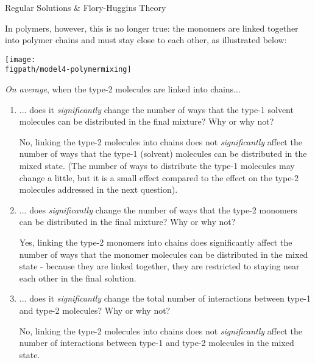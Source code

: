 \begin{activity}{Regular Solutions \& Flory-Huggins Theory}
\begin{model}
In polymers, however, this is no longer true: the monomers are linked together into polymer chains and must stay close to each other, as illustrated below: 
	
	\centerline{\texttt{[image: \\figpath/model4-polymermixing]}}

\end{model}

\begin{ctqs}

	\question \emph{On average}, when the type-2 molecules are linked into chains...
	
		\begin{enumerate}
			\item ... does it \emph{significantly} change the number of ways that the type-1 solvent molecules can be distributed in the final mixture?  Why or why not?
				\label{\labelbase:ctq:FHtype1}
			
				\begin{solution}[1in]{}
					No, linking the type-2 molecules into chains does not \emph{significantly} affect the number of ways that the type-1 (solvent) molecules can be distributed in the mixed state.  (The number of ways to distribute the type-1 molecules may change a little, but it is a small effect compared to the effect on the type-2 molecules addressed in the next question).
				\end{solution}
			
			\item ... does \emph{significantly} change the number of ways that the type-2 monomers can be distributed in the final mixture?  Why or why not?
				\label{\labelbase:ctq:FHtype2}
			
				\begin{solution}[1in]{}
					Yes, linking the type-2 monomers into chains does  significantly affect the number of ways that the monomer molecules can be distributed in the mixed state - because they are linked together, they are restricted to staying near each other in the final solution.
				\end{solution}
			
			\item ... does it \emph{significantly} change the total number of interactions between type-1 and type-2 molecules?  Why or why not?
				\label{\labelbase:ctq:FHinteraction}
			
				\begin{solution}[1in]{}
					No, linking the type-2 molecules into chains does not \emph{significantly} affect the number of interactions between type-1 and type-2 molecules in the mixed state.
				\end{solution}
				

\end{enumerate}
\end{ctqs}
\end{activity}
